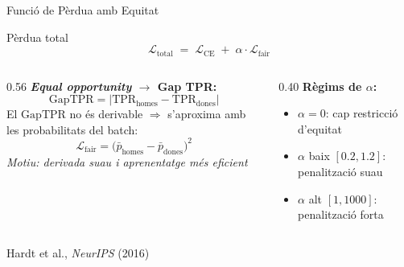 \documentclass[aspectratio=169,12pt]{beamer}
\newcommand{\gap}{\ensuremath{\mathrm{GapTPR}}}
\begin{document}
\begin{frame}{Funció de Pèrdua amb Equitat}
  \begin{block}{Pèrdua total}
    \[
      \mathcal{L}_{\text{total}} \;=\; \mathcal{L}_{\text{CE}} \;+\; \alpha \cdot \mathcal{L}_{\text{fair}}
    \]
  \end{block}

  \vspace{0.4em}
  \begin{columns}[T]
    \begin{column}{0.56\textwidth}
      \textbf{\textit{Equal opportunity} $\rightarrow$ Gap TPR:}
      \[
        \gap = \left|\mathrm{TPR}_{\text{homes}} - \mathrm{TPR}_{\text{dones}}\right|
      \]
      \vspace{-0.2em}
      {\small El $\gap$ no és derivable $\Rightarrow$ s'aproxima amb les probabilitats del batch:}
      \[
        \mathcal{L}_{\text{fair}} = \bigl(\bar{p}_{\text{homes}} - \bar{p}_{\text{dones}}\bigr)^{2}
      \]
      {\scriptsize\textit{Motiu: derivada suau i aprenentatge més eficient}}
    \end{column}
    \begin{column}{0.40\textwidth}
      \textbf{Règims de $\alpha$:}
      \begin{itemize}
        \item $\alpha = 0$: cap restricció d'equitat
        \item $\alpha$ baix $[0.2,1.2]$: penalització suau
        \item $\alpha$ alt $[1,1000]$: penalització forta
      \end{itemize}
    \end{column}
  \end{columns}
  \vspace{0.2em}
  {\tiny\color{gray} Hardt et al., \textit{NeurIPS} (2016)}
\end{frame}
\end{document}
